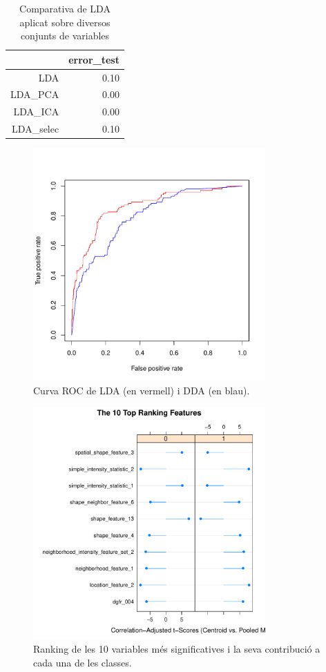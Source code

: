 \documentclass[a4paper,10pt]{article}
\begin{document}
\begin{table}[ht]
\begin{center}
\begin{tabular}{rr}
  \hline
 & error\_test \\ 
  \hline
LDA & 0.10 \\ 
  LDA\_PCA & 0.00 \\ 
  LDA\_ICA & 0.00 \\ 
  LDA\_selec & 0.10 \\ 
   \hline
\end{tabular}
\caption{Comparativa de LDA aplicat sobre diversos conjunts de variables}
\label{tab:error_da2}
\end{center}
\end{table}

\begin{figure}
\centering
\includegraphics[width=3.5in]{memoria-da_roc}
\caption{Curva ROC de LDA (en vermell) i DDA (en blau).} \label{fig:da_roc}
\end{figure}


\begin{figure}
\includegraphics[width=3.5in]{memoria-top_var_da}
\caption{Ranking de les 10 variables més significatives i la seva contribució a cada una de les classes.} \label{fig:top_var_da}
\end{figure}
\end{document}
